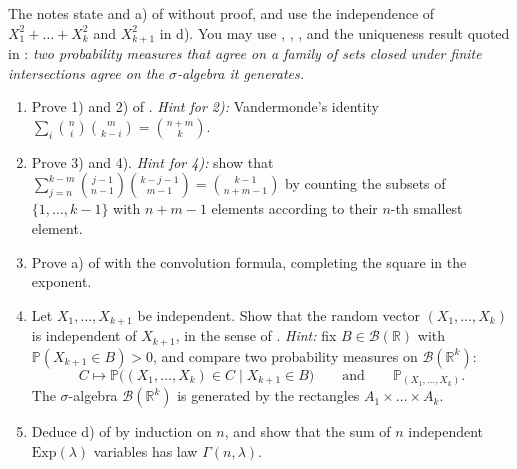\begin{exercise}\label{ex:rv-notable-sums}
\hard The notes state  and a) of 
without proof, and use the independence of $X_1^2+\dots+X_k^2$ and $X_{k+1}^2$ in d). You may use
, , ,
and the uniqueness result quoted in : \emph{two probability measures
that agree on a family of sets closed under finite intersections agree on the $\sigma$-algebra it
generates.}
\begin{enumerate}[label=(\alph*)]
  \item Prove 1) and 2) of . \emph{Hint for 2):} Vandermonde's
    identity $\sum_i\binom ni\binom m{k-i}=\binom{n+m}k$.
  \item Prove 3) and 4). \emph{Hint for 4):} show that
    $\sum_{j=n}^{k-m}\binom{j-1}{n-1}\binom{k-j-1}{m-1}=\binom{k-1}{n+m-1}$ by counting the subsets of
    $\{1,\dots,k-1\}$ with $n+m-1$ elements according to their $n$-th smallest element.
  \item Prove a) of  with the convolution formula, completing the
    square in the exponent.
  \item Let $X_1,\dots,X_{k+1}$ be independent. Show that the random vector $(X_1,\dots,X_k)$ is
    independent of $X_{k+1}$, in the sense of . \emph{Hint:} fix $B\in\mathcal B(\mathbb R)$ with
    $\mathbb P(X_{k+1}\in B)>0$, and compare two probability measures on $\mathcal B(\mathbb R^k)$:
    \[
      C\mapsto\mathbb P\big((X_1,\dots,X_k)\in C\mid X_{k+1}\in B\big)\qquad\text{and}\qquad
      \mathbb P_{(X_1,\dots,X_k)} .
    \]
    The $\sigma$-algebra $\mathcal B(\mathbb R^k)$ is generated by the rectangles
    $A_1\times\dots\times A_k$.
  \item Deduce d) of  by induction on $n$, and show that the sum of
    $n$ independent $\mathrm{Exp}(\lambda)$ variables has law $\Gamma(n,\lambda)$.
\end{enumerate}
\end{exercise}

